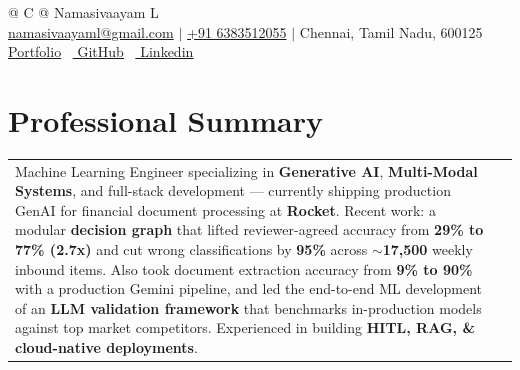 \documentclass[a4paper,10pt]{article}
\begin{document}
    
    \pagestyle{empty}
    
    \begin{tabularx}{\linewidth}{@{} C @{}}
    \color[HTML]{1C033C} \Huge{Namasivaayam L} \\[25pt]
    
    \textcolor[HTML]{371e77}{\href{mailto:namasivaayaml@gmail.com}{{{\faEnvelope} namasivaayaml@gmail.com}} $|$}
    \textcolor[HTML]{371e77}{{\faPhone} {\href{tel:+916383512055}{+91 6383512055}} $|$}
    \textcolor[HTML]{371e77}{{{{\faMapMarker} Chennai, Tamil Nadu, 600125}}}
    \\[2pt]
    \textcolor[HTML]{371e77}{\href{https://namasivaayam-l.github.io/namasivaayam-folio}{\underline{{\raisebox{-0.05\height}{\faGlobe} Portfolio}}}} \
    \textcolor[HTML]{371e77}{\href{https://github.com/Namasivaayam-L}{\underline{{\raisebox{-0.05\height}{\faGithub} GitHub}}}} \
    \textcolor[HTML]{371e77}{\href{https://www.linkedin.com/in/namasivaayam-l-42bb601b1/}{\underline{{\raisebox{-0.05\height}{\faLinkedin} Linkedin}}}}
    
    \end{tabularx}
    
    \vspace{6pt}
    \section{Professional Summary}
    \begin{tabularx}{\linewidth}{ @{}l r@{} }
    \begin{minipage}[t]{\linewidth}
        Machine Learning Engineer specializing in \textbf{Generative AI}, \textbf{Multi-Modal Systems}, and full-stack development — currently shipping production GenAI for financial document processing at \textbf{Rocket}. Recent work: a modular \textbf{decision graph} that lifted reviewer-agreed accuracy from \textbf{29\% to 77\% (2.7x)} and cut wrong classifications by \textbf{95\%} across \textbf{$\sim$17,500} weekly inbound items. Also took document extraction accuracy from \textbf{9\% to 90\%} with a production Gemini pipeline, and led the end-to-end ML development of an \textbf{LLM validation framework} that benchmarks in-production models against top market competitors. Experienced in building \textbf{HITL, RAG, \& cloud-native deployments}.
    \end{minipage}
    \end{tabularx}
    \\[1pt]
    
\end{document}
